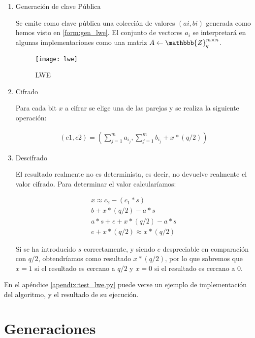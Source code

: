 \begin{enumerate}
  \item Generación de clave Pública

  Se emite como clave pública una colección de valores $(ai, bi)$ generada como hemos visto en \ref{form:gen_lwe}. El conjunto de vectores $a_i$ se interpretará en algunas implementaciones como una matriz $A \leftarrow \mathbbb{Z}_q^{m \times n}$.

    \begin{figure}[h]
      \caption{LWE \cite{halevi_homomorphic_2017}}
      \label{fig:lwe}
      \texttt{[image: lwe]}
    \end{figure}

  \item Cifrado

  Para cada bit $x$ a cifrar se elige una de las parejas y se realiza la siguiente operación:

    \begin{gather*}
        \label{form:cifrado_lwe}
        (c1, c2) = (\sum_{j=1}^{m} a_i_j, \sum_{j=1}^{m} b_i_j + x * (q/2))
    \end{gather*}

  \item Descifrado

  El resultado realmente no es determinista, es decir, no devuelve realmente el valor cifrado. Para determinar el valor calcularíamos:

    \begin{gather*}
        \label{form:descifrado_lwe}
        x \approx c_2 - (c_1*s) \\
        b + x*(q/2) - a*s \\
        a*s + e + x*(q/2) - a*s \\
        e + x*(q/2) \approx x * (q/2)
    \end{gather*}

  Si se ha introducido $s$ correctamente, y siendo $e$ despreciable en comparación con $ q/2 $, obtendríamos como resultado $ x * (q/2) $, por lo que sabremos que $ x = 1$ si el resultado es cercano a $ q/2 $ y  $ x = 0 $ si el resultado es cercano a $ 0 $.

\end{enumerate}

En el apéndice \ref{apendix:test_lwe.py} puede verse un ejemplo de implementación del algoritmo, y el resultado de su ejecución.

\section{Generaciones}

